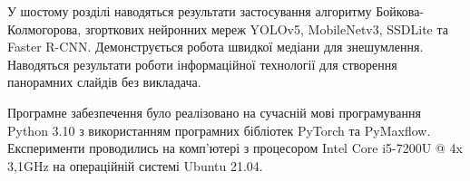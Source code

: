 У шостому розділі наводяться результати 
застосування алгоритму Бойкова-Колмогорова,
згорткових нейронних мереж  YOLOv5, MobileNetv3, SSDLite та
Faster R-CNN. Демонструється робота швидкої медіани для знешумлення. 
Наводяться результати роботи інформаційної технології для створення 
панорамних слайдів без викладача.

Програмне забезпечення було реалізовано
на сучасній мові програмування Python 3.10 \cite{python_language}
з використанням програмних бібліотек PyTorch \cite{pytorch_library} та PyMaxflow.
Експерименти проводились на комп'ютері з
процесором Intel Core i5-7200U @ 4x 3,1GHz на операційній системі Ubuntu 21.04.
